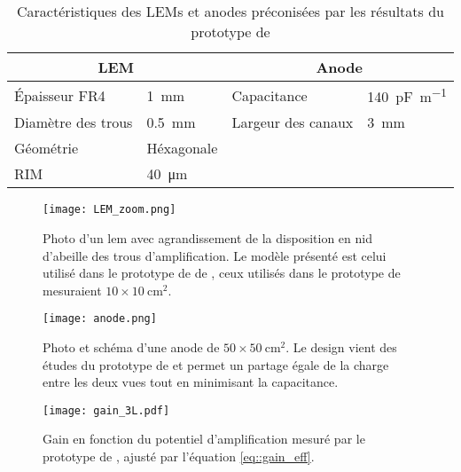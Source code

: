       \begin{table}[]
        \centering
        \begin{tabular}{|ll||ll|}
          \hline
          \multicolumn{2}{|c||}{LEM} & \multicolumn{2}{c|}{Anode} \\ \hline \hline
          Épaisseur FR4 & \SI{1}{\milli\meter} & Capacitance & \SI{140}{\pico\farad\per\meter} \\
          Diamètre des trous & \SI{0.5}{\milli\meter} & Largeur des canaux & \SI{3}{\milli\meter} \\
          Géométrie & Héxagonale &  &  \\
          RIM & \SI{40}{\micro\meter} &  &  \\ \hline
        \end{tabular}
        \caption[Caractéristiques des LEMs et anodes utilisé dans le \threeL{}]{\label{tab::lem_anode}Caractéristiques des LEMs et anodes préconisées par les résultats du prototype de \threeL{}}
      \end{table}

      \begin{figure}[htbp]
        \begin{center}\texttt{[image: LEM\_zoom.png]}\end{center}
        \caption[Photo d'un amplificateur d'électron.]{Photo d'un \gls{lem} avec agrandissement de la disposition en nid d'abeille des trous d'amplification. Le modèle présenté est celui utilisé dans le prototype de \TOO{} de \protodp{}, ceux utilisés dans le prototype de \threeL{} mesuraient $10\times\SI{10}{\centi\meter\squared}$.}
        \label{fig::lem}
      \end{figure}

      \begin{figure}[htbp]
        \begin{center}\texttt{[image: anode.png]}\end{center}
        \caption[Photo et schéma d'une anode.]{Photo et schéma d'une anode de $50\times\SI{50}{\centi\meter\squared}$. Le design vient des études du prototype de \threeL{}\cite{Wu2017,Cantini2013} et permet un partage égale de la charge entre les deux vues tout en minimisant la capacitance.}
        \label{fig::anode}
      \end{figure}

      \begin{figure}[htbp]
        \begin{center}\texttt{[image: gain\_3L.pdf]}\end{center}
        \caption[Gain en fonction du potentiel mesuré par le prototype de \threeL{}.]{
        \label{fig::3L_gain}Gain en fonction du potentiel d'amplification mesuré par le prototype de \threeL{}, ajusté par l'équation \eqref{eq::gain_eff}.}
      \end{figure}

